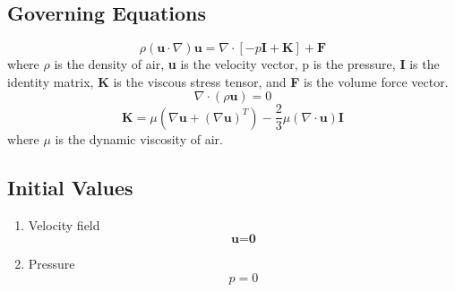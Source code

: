     \subsection{Governing Equations}
        \begin{equation}
            \rho (\textbf{u} \cdot \nabla) \textbf{u} = \nabla \cdot \left[-p\textbf{I} + \textbf{K} \right] + \textbf{F} 
        \end{equation}
            \noindent where \(\rho\) is the density of air, \textbf{u} is the velocity vector, p is the pressure, \textbf{I} is the identity matrix, \textbf{K} is the viscous stress tensor, and \textbf{F} is the volume force vector.
        \begin{equation}
            \nabla \cdot (\rho \textbf{u})= 0 %
        \end{equation}
        \begin{equation}
            \textbf{K} = \mu (\nabla \textbf{u} + (\nabla \textbf{u})^T) - \frac{2}{3} \mu (\nabla \cdot \textbf{u})\textbf{I} %
        \end{equation}
            where \textbf{\(\mu\)} is the dynamic viscosity of air. 

    \subsection{Initial Values}
        \begin{enumerate}
            \item Velocity field
                \begin{equation}
                    \textbf{u} = \textbf{0}
                \end{equation}
            \item Pressure
                \begin{equation}
                    p = 0
                \end{equation}
        \end{enumerate}


